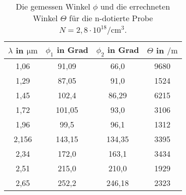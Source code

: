 \begin{table}
    \centering
    \caption{Die gemessen Winkel $\phi$ und die errechneten Winkel $\Theta$ für die n-dotierte Probe $N = 2,8 \cdot 10^{18} \si{\per\cubic\cm}$.}
    \label{tab:bla}
    \begin{tabular}{c c c c}
        \toprule
        $\lambda$ in $\si{\um}$ & $\phi_1$ in Grad  & $\phi_2$ in Grad & $\Theta$ in $\si{\per\meter}$ \\
        \midrule
        1,06  &  91,09  &  66,0  &  9680  \\
        1,29  &  87,05  &  91,0  &  1524  \\
        1,45  &  102,4  &  86,29  &  6215 \\
        1,72  &  101,05  &  93,0  &  3106 \\
        1,96  &  99,5  &  96,1  &  1312 \\
        2,156  &  143,15  &  134,35  &  3395 \\
        2,34  &  172,0  &  163,1  &  3434  \\
        2,51  &  215,0  &  210,0  &  1929  \\
        2,65  &  252,2  &  246,18  &  2323  \\
        \bottomrule
    \end{tabular}
\end{table}
